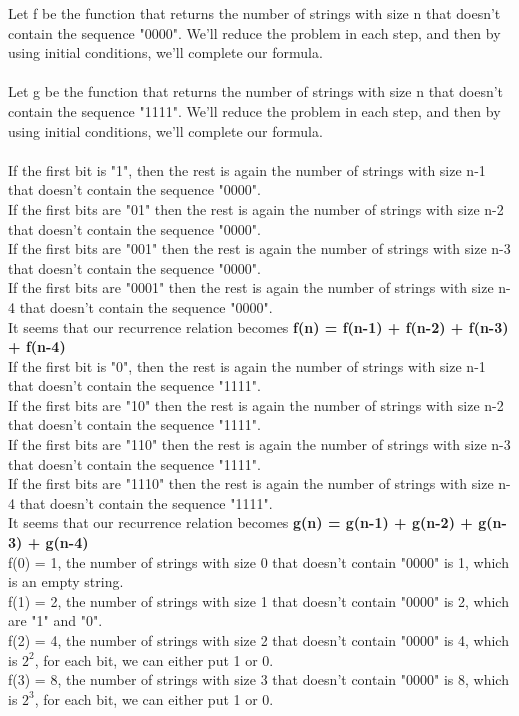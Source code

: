 \documentclass[12pt]{article}
\begin{document}
Let f be the function that returns the number of strings with size n that doesn't contain the sequence "0000". We'll reduce the problem in each step, and then by using initial conditions, we'll complete our formula.\\\\ 

Let g be the function that returns the number of strings with size n that doesn't contain the sequence "1111". We'll reduce the problem in each step, and then by using initial conditions, we'll complete our formula.\\\\ 

\noindent If the first bit is "1", then the rest is again the number of strings with size n-1 that doesn't contain the sequence "0000".\\
If the first bits are "01" then the rest is again the number of strings with size n-2 that doesn't contain the sequence "0000".\\
If the first bits are "001" then the rest is again the number of strings with size n-3 that doesn't contain the sequence "0000".\\
If the first bits are "0001" then the rest is again the number of strings with size n-4 that doesn't contain the sequence "0000".\\

It seems that our recurrence relation becomes \textbf{f(n) = f(n-1) + f(n-2) + f(n-3) + f(n-4)}\\

\noindent If the first bit is "0", then the rest is again the number of strings with size n-1 that doesn't contain the sequence "1111".\\
If the first bits are "10" then the rest is again the number of strings with size n-2 that doesn't contain the sequence "1111".\\
If the first bits are "110" then the rest is again the number of strings with size n-3 that doesn't contain the sequence "1111".\\
If the first bits are "1110" then the rest is again the number of strings with size n-4 that doesn't contain the sequence "1111".\\

It seems that our recurrence relation becomes \textbf{g(n) = g(n-1) + g(n-2) + g(n-3) + g(n-4)}\\

\noindent f(0) = 1, the number of strings with size 0 that doesn't contain "0000" is 1, which is an empty string. \\
f(1) = 2, the number of strings with size 1 that doesn't contain "0000" is 2, which are "1" and "0". \\
f(2) = 4, the number of strings with size 2 that doesn't contain "0000" is 4, which is $2^2$, for each bit, we can either put 1 or 0. \\
f(3) = 8, the number of strings with size 3 that doesn't contain "0000" is 8, which is $2^3$, for each bit, we can either put 1 or 0.\\\\
\end{document}
